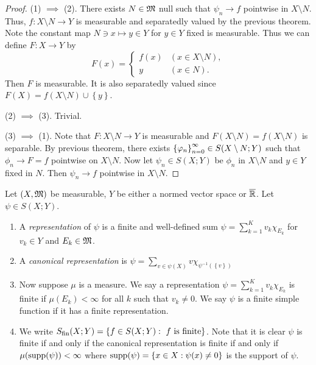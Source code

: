 \documentclass[a4paper]{article}
\begin{document}
\begin{proof}
  
(1) $\implies$ (2). There exists $N \in \mathfrak{M}$ null such that 
$\psi_n \to f$ pointwise in $X \setminus N$. Thus, 
$f: X \setminus N \to Y$ is measurable and separatedly valued
by the previous theorem. Note the constant map 
$N \ni x \mapsto y \in Y$ for $y \in Y$ fixed is measurable. 
Thus we can define $F : X \to Y$ by 
\[
F(x) = \begin{cases}
  f(x) & (x \in X \setminus N), \\
  y & (x \in N).
\end{cases}
\]
Then $F$ is measurable. It is also separatedly valued 
since $F(X) = f(X \setminus N) \cup \left\{ y \right\}$.

(2) $\implies$ (3). Trivial.

(3) $\implies$ (1). Note that $F: X \setminus N \to Y$ is measurable
and $F(X \setminus N) = f(X \setminus N)$ is separable.
By previous theorem, there exists $\left\{ \varphi_n \right\}_{n=0}^\infty \in S(X 
\setminus N ; Y)$ such that $\phi_n \to F = f$ 
pointwise on $X \setminus N$.
Now let $\psi_n \in S(X; Y)$ be $\phi_n$ in $X \setminus N$ 
and $y \in Y$ fixed in $N$. Then $\psi_n \to f$ pointwise
in $X \setminus N$.

\end{proof}

\begin{defi}
  
Let $(X, \mathfrak{M})$ be measurable, $Y$ be either a normed vector
space or $\overline{\mathbb{R}}$. Let $\psi \in S(X; Y)$.
\begin{enumerate}
  \item A \emph{representation} of $\psi$ is a finite and 
  well-defined sum 
  $\psi = \sum_{k=1}^K v_k \chi_{E_k}$ 
  for $v_k \in Y$ and $E_k \in \mathfrak{M}$.
  
  \item A \emph{canonical representation} is 
  $\psi = \sum_{v \in \psi(X)} v \chi_{\psi^{-1}
  (\left\{ v \right\})}$
  \item Now suppose $\mu$ is a measure.
  We say a representation $\psi = \sum_{k=1}^K 
  v_k \chi_{E_k}$ is finite if $\mu(E_k) < \infty$
  for all $k$ such that $v_k \neq 0$. We 
  say $\psi$ is a finite simple function if it has a 
  finite representation.
  
  \item We write $S_{\text{fin}}(X; Y) = \left\{ 
    f \in S(X; Y) : \text{ $f$ is finite}
   \right\}$.
  Note that it is clear $\psi$ is finite if and only if 
  the canonical representation is finite if and only if 
  $\mu(\operatorname{supp}(\psi)) < \infty$ where 
  $\operatorname{supp}(\psi) = \left\{ x \in X : \psi(x) \neq 0 \right\}$
  is the support of $\psi$.
\end{enumerate}

\end{defi}
\end{document}
